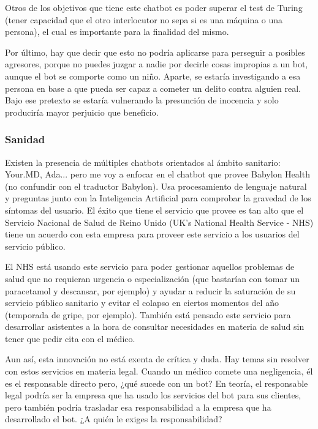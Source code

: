 \documentclass[spanish,12pt, a4paper, twoside]{paper}
\begin{document}
Otros de los objetivos que tiene este chatbot es poder superar el test de Turing (tener capacidad que el otro interlocutor no sepa si es una máquina o una persona), el cual es importante para la finalidad del mismo.
\newline

Por último, hay que decir que esto no podría aplicarse para perseguir a posibles agresores, porque no puedes juzgar a nadie por decirle cosas impropias a un bot, aunque el bot se comporte como un niño. Aparte, se estaría investigando a esa persona en base a que pueda ser capaz a cometer un delito contra alguien real. Bajo ese pretexto se estaría vulnerando la presunción de inocencia y solo produciría mayor perjuicio que beneficio.

\subsubsection{Sanidad}

Existen la presencia de múltiples chatbots orientados al ámbito sanitario: Your.MD, Ada... pero me voy a enfocar en el chatbot que provee Babylon Health (no confundir con el traductor Babylon). Usa procesamiento de lenguaje natural y preguntas junto con la Inteligencia Artificial para comprobar la gravedad de los síntomas del usuario. El éxito que tiene el servicio que provee es tan alto que el Servicio Nacional de Salud de Reino Unido (UK's National Health Service - NHS) tiene un acuerdo con esta empresa para proveer este servicio a los usuarios del servicio público.
\newline

El NHS está usando este servicio para poder gestionar aquellos problemas de salud que no requieran urgencia o especialización (que bastarían con tomar un paracetamol y descansar, por ejemplo) y ayudar a reducir la saturación de su servicio público sanitario y evitar el colapso en ciertos momentos del año (temporada de gripe, por ejemplo).
También está pensado este servicio para desarrollar asistentes a la hora de consultar necesidades en materia de salud sin tener que pedir cita con el médico.
\newline

Aun así, esta innovación no está exenta de crítica y duda. Hay temas sin resolver con estos servicios en materia legal. Cuando un médico comete una negligencia, él es el responsable directo pero, ¿qué sucede con un bot? En teoría, el responsable legal podría ser la empresa que ha usado los servicios del bot para sus clientes, pero también podría trasladar esa responsabilidad a la empresa que ha desarrollado el bot. ¿A quién le exiges la responsabilidad?
\end{document}
